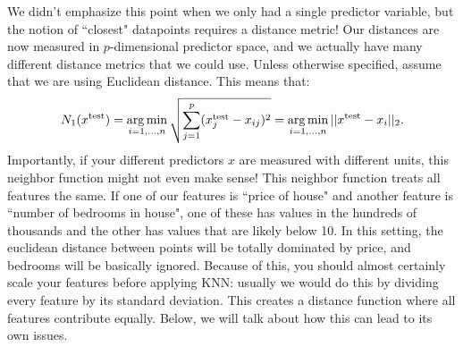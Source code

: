 We didn't emphasize this point when we only had a single predictor variable, but the notion of ``closest" datapoints requires a distance metric! Our distances are now measured in $p$-dimensional predictor space, and we actually have many different distance metrics that we could use. Unless otherwise specified, assume that we are using Euclidean distance. This means that:
$$
N_1(x^{\mathrm{test}}) = \mathop{\mathrm{arg\,min}}_{i = 1,\ldots, n} \sqrt{ \sum_{j=1}^p (x^{\mathrm{test}}_j - x_{ij})^2} = \mathop{\mathrm{arg\,min}}_{i = 1,\ldots, n} || x^{\mathrm{test}} - x_i ||_2. 
$$
Importantly, if your different predictors $x$ are measured with different units, this neighbor function might not even make sense! This neighbor function treats all features the same. If one of our features is ``price of house" and another feature is ``number of bedrooms in house", one of these has values in the hundreds of thousands and the other has values that are likely below 10. In this setting, the euclidean distance between points will be totally dominated by price, and bedrooms will be basically ignored. Because of this, you should almost certainly scale your features before applying KNN: usually we would do this by dividing every feature by its standard deviation. This creates a distance function where all features contribute equally. Below, we will talk about how this can lead to its own issues. 

